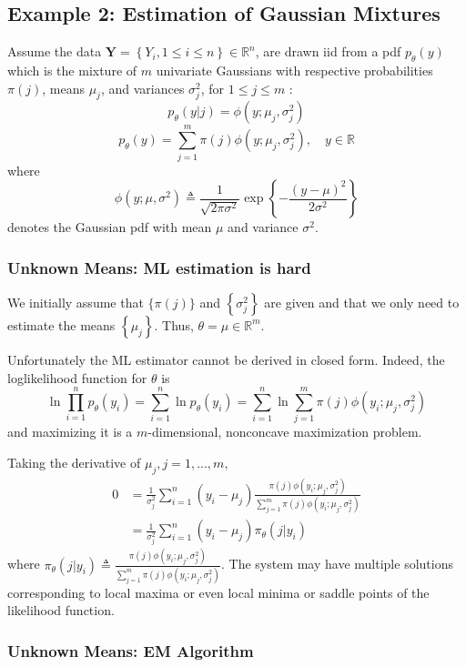 \documentclass[11pt,a4paper]{article}
\begin{document}
\subsection{Example 2: Estimation of Gaussian Mixtures}
Assume the data $\boldsymbol{Y}=\left\{Y_i, 1 \leq i \leq n\right\} \in \mathbb{R}^n$, are drawn iid from a pdf $p_\theta(y)$ which is the mixture of $m$ univariate Gaussians with respective probabilities $\pi(j)$, means $\mu_j$, and variances $\sigma_j^2$, for $1 \leq j \leq m$ :
$$p_\theta(y|j)=\phi\left(y ; \mu_j, \sigma_j^2\right)$$
$$
p_\theta(y)=\sum_{j=1}^m \pi(j) \phi\left(y ; \mu_j, \sigma_j^2\right), \quad y \in \mathbb{R}
$$
where
$$\phi\left(y ; \mu, \sigma^2\right) \triangleq \frac{1}{\sqrt{2 \pi \sigma^2}} \exp \left\{-\frac{(y-\mu)^2}{2 \sigma^2}\right\}$$
denotes the Gaussian pdf with mean $\mu$ and variance $\sigma^2$.
\subsubsection{Unknown Means: ML estimation is hard}
We initially assume that $\{\pi(j)\}$ and $\left\{\sigma_j^2\right\}$ are given and that we only need to estimate the means $\left\{\mu_j\right\}$. Thus, $\theta=\mu \in \mathbb{R}^m$.

Unfortunately the ML estimator cannot be derived in closed form. Indeed, the loglikelihood function for $\theta$ is
$$
\ln \prod_{i=1}^n p_\theta(y_i)=\sum_{i=1}^n \ln p_\theta\left(y_i\right)=\sum_{i=1}^n \ln \sum_{j=1}^m \pi(j) \phi\left(y_i ; \mu_j, \sigma_j^2\right)
$$
and maximizing it is a $m$-dimensional, nonconcave maximization problem.

Taking the derivative of $\mu_j, j=1,...,m$,
\begin{equation}
    \begin{aligned}
        0&=\frac{1}{\sigma^2_j}\sum_{i=1}^n(y_i-\mu_j)\frac{\pi(j)\phi(y_i ; \mu_j, \sigma_j^2)}{\sum_{j=1}^m\pi(j)\phi(y_i ; \mu_j, \sigma_j^2)}\\
        &=\frac{1}{\sigma^2_j}\sum_{i=1}^n(y_i-\mu_j)\pi_\theta(j|y_i)
    \end{aligned}
    \nonumber
\end{equation}
where $\pi_\theta(j|y_i)\triangleq \frac{\pi(j)\phi(y_i ; \mu_j, \sigma_j^2)}{\sum_{j=1}^m\pi(j)\phi(y_i ; \mu_j, \sigma_j^2)}$.
The system may have multiple solutions corresponding to local maxima or even local minima or saddle points of the likelihood function.

\subsubsection{Unknown Means: EM Algorithm}
\end{document}
